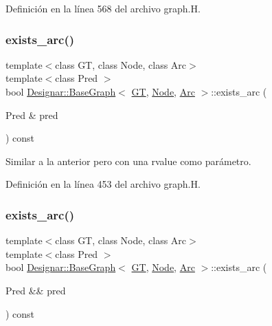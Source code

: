 Definición en la línea 568 del archivo graph.\+H.

\mbox{\label{class_designar_1_1_base_graph_aaed186c42ed6b51f761cda959ecde601}} 
\subsubsection{\texorpdfstring{exists\+\_\+arc()}{exists\_arc()}\hspace{0.1cm}{\footnotesize\ttfamily [1/2]}}
{\footnotesize\ttfamily template$<$class GT, class Node, class Arc$>$ \\
template$<$class Pred $>$ \\
bool \hyperlink{class_designar_1_1_base_graph}{Designar\+::\+Base\+Graph}$<$ \hyperlink{demo-buildgraph_8_c_a3001c40d2c31ca87ed96cd7d1334a55e}{GT}, \hyperlink{namespace_designar_a5af326c65aa2bd26b26c410f2030d09e}{Node}, \hyperlink{namespace_designar_a3f55fb5513d62ff47cbc8f72b8e95d6f}{Arc} $>$\+::exists\+\_\+arc (\begin{DoxyParamCaption}\item[{Pred \&}]{pred }\end{DoxyParamCaption}) const\hspace{0.3cm}{\ttfamily [inline]}}



Similar a la anterior pero con una rvalue como parámetro. 



Definición en la línea 453 del archivo graph.\+H.

\mbox{\label{class_designar_1_1_base_graph_aebf517d972db553b03f2c4dbe4228d79}} 
\subsubsection{\texorpdfstring{exists\+\_\+arc()}{exists\_arc()}\hspace{0.1cm}{\footnotesize\ttfamily [2/2]}}
{\footnotesize\ttfamily template$<$class GT, class Node, class Arc$>$ \\
template$<$class Pred $>$ \\
bool \hyperlink{class_designar_1_1_base_graph}{Designar\+::\+Base\+Graph}$<$ \hyperlink{demo-buildgraph_8_c_a3001c40d2c31ca87ed96cd7d1334a55e}{GT}, \hyperlink{namespace_designar_a5af326c65aa2bd26b26c410f2030d09e}{Node}, \hyperlink{namespace_designar_a3f55fb5513d62ff47cbc8f72b8e95d6f}{Arc} $>$\+::exists\+\_\+arc (\begin{DoxyParamCaption}\item[{Pred \&\&}]{pred }\end{DoxyParamCaption}) const\hspace{0.3cm}{\ttfamily [inline]}}



